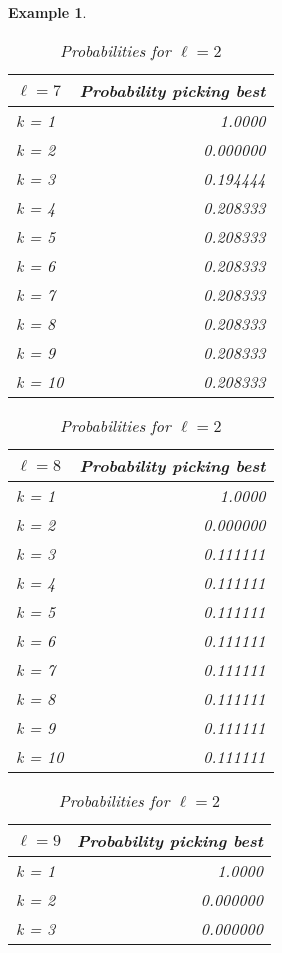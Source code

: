 \documentclass{article}
\newtheorem{example}{Example} %
\begin{document}
\begin{example}
\begin{table}[H]
\centering
\begin{minipage}{0.33\textwidth}

\small
\begin{tabular}{lr}
\hline
$\ell=7$ & Probability picking best  \\
\hline
k = 1  &     1.0000  \\
k = 2  &     0.000000  \\
k = 3  &     0.194444  \\
k = 4  &     0.208333  \\
k = 5  &     0.208333  \\
k = 6  &     0.208333  \\
k = 7  &     0.208333  \\
k = 8  &     0.208333  \\
k = 9  &     0.208333  \\
k = 10 &     0.208333  \\
\hline
\end{tabular}
\caption{Probabilities for $\ell=1$}
\end{minipage}\hfill
\centering
\begin{minipage}{0.33\textwidth}
\small
\begin{tabular}{lr}
\hline
$\ell=8$ & Probability picking best \\
\hline
k = 1  &     1.0000 \\
k = 2  &     0.000000 \\
k = 3  &     0.111111  \\
k = 4  &     0.111111 \\
k = 5  &     0.111111 \\
k = 6  &     0.111111  \\
k = 7  &     0.111111 \\
k = 8  &     0.111111  \\
k = 9  &     0.111111  \\
k = 10 &     0.111111  \\
\hline
\end{tabular}
\caption{Probabilities for $\ell=2$}
\end{minipage}\hfill
\centering
\begin{minipage}{0.33\textwidth}
\small
\begin{tabular}{lr}
\hline
$\ell=9$ & Probability picking best  \\
\hline
k = 1  &     1.0000 \\
k = 2  &     0.000000 \\
k = 3  &     0.000000  \\

\end{tabular}
\end{minipage}
\end{table}
\end{example}
\end{document}
